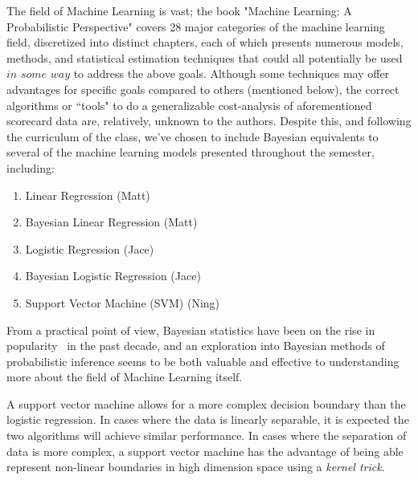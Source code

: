 \documentclass[10pt]{article}
\begin{document}
The field of Machine Learning is vast; the book "Machine Learning: A Probabilistic Perspective" \cite{murphy2012machine} covers 28 major categories of the machine learning field, discretized into distinct chapters, each of which presents numerous models, methods, and statistical estimation techniques that could all potentially be used $\textit{in some way}$ to address the above goals. Although some techniques may offer advantages for specific goals compared to others (mentioned below), the correct algorithms or ``tools" to do a generalizable cost-analysis of aforementioned scorecard data are, relatively, unknown to the authors. Despite this, and following the curriculum of the class, we've chosen to include Bayesian equivalents to several of the machine learning models presented throughout the semester, including: 
\begin{enumerate}
	\item Linear Regression (Matt)
    \item Bayesian Linear Regression (Matt)
    \item Logistic Regression (Jace)
    \item Bayesian Logistic Regression (Jace)
    \item Support Vector Machine (SVM) (Ning)
\end{enumerate}


From a practical point of view, Bayesian statistics have been on the rise in popularity~\cite{ashby2006bayesian} in the past decade, and an exploration into Bayesian methods of probabilistic inference seems to be both valuable and effective to understanding more about the field of Machine Learning itself. 

A support vector machine allows for a more complex decision boundary than the logistic regression. In cases where the data is linearly separable, it is expected the two algorithms will achieve similar performance. In cases where the separation of data is more complex, a support vector machine has the advantage of being able represent non-linear boundaries in high dimension space using a \textit{kernel trick}.
\end{document}
